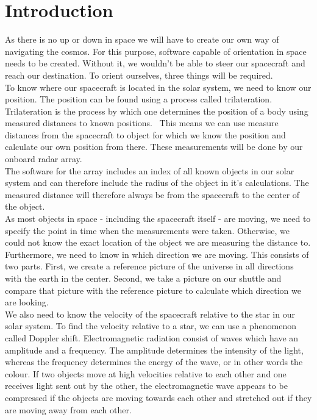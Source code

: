 \documentclass[reprint,english,notitlepage]{revtex4-2}
\begin{document}
\section{Introduction} \label{sec:introduction}
As there is no up or down in space we will have to create our own way of navigating the cosmos.
For this purpose, software capable of orientation in space needs to be created.
Without it, we wouldn't be able to steer our spacecraft and reach our destination.
To orient ourselves, three things will be required.\\
To know where our spacecraft is located in the solar system, we need to know our position.
The position can be found using a process called trilateration.\\
Trilateration is the process by which one determines the position of a body using measured distances to known positions.~\parencite[][]{Relevant_theory}
This means we can use measure distances from the spacecraft to object for which we know the position and calculate our own position from there.
These measurements will be done by our onboard radar array.\\
The software for the array includes an index of all known objects in our solar system and can therefore include the radius of the object in it's calculations.
The measured distance will therefore always be from the spacecraft to the center of the object.\\
As most objects in space - including the spacecraft itself - are moving, we need to specify the point in time when the measurements were taken.
Otherwise, we could not know the exact location of the object we are measuring the distance to.\\
Furthermore, we need to know in which direction we are moving.
This consists of two parts.
First, we create a reference picture of the universe in all directions with the earth in the center.
Second, we take a picture on our shuttle and compare that picture with the reference picture to calculate which direction we are looking.\\
We also need to know the velocity of the spacecraft relative to the star in our solar system.
To find the velocity relative to a star, we can use a phenomenon called Doppler shift.
Electromagnetic radiation consist of waves which have an amplitude and a frequency.
The amplitude determines the intensity of the light, whereas the frequency determines the energy of the wave, or in other words the colour.
If two objects move at high velocities relative to each other and one receives light sent out by the other, the electromagnetic wave appears to be compressed if the objects are moving towards each other and stretched out if they are moving away from each other.
\end{document}
